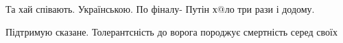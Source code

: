 \begin{itemize}
Та хай співають. Українською. По фіналу- Путін х@ло три рази і додому.

 
Підтримую сказане. Толерантсність до ворога породжує смертність серед своїх

\end{itemize}

